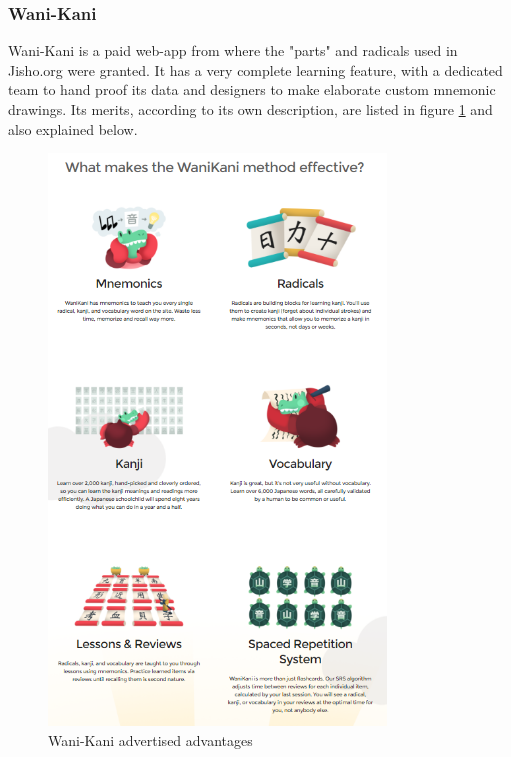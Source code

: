 \subsubsection{Wani-Kani}

Wani-Kani\cite{wanikani} is a paid web-app from where the "parts" and radicals used in Jisho.org were granted. It has a very complete learning feature, with a dedicated team to hand proof its data and designers to make elaborate custom mnemonic drawings. Its merits, according to its own description, are listed in figure \ref{fig:wanikani} and also explained below.

\begin{figure}[ht]
    \centering
    \includegraphics[width=0.8\textwidth]{Cap1/WaniKani}
    \caption{Wani-Kani advertised advantages}
    \label{fig:wanikani}
\end{figure}

